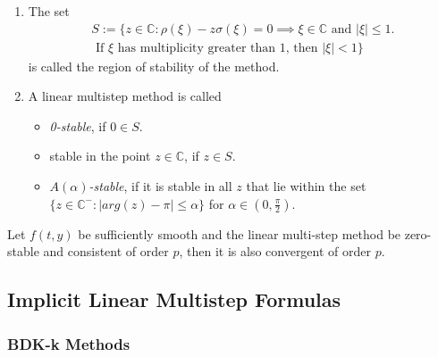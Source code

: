 	\begin{frame}
			\begin{definition}
			\begin{enumerate}
				\item 
				The set
				\begin{equation}
					\begin{aligned}
						S := \{z \in \mathbb{C} : \rho(\xi) - z \sigma(\xi) = 0 \implies \xi \in \mathbb{C} \text{ and } |\xi| \leq 1. \\
						\text{ If $\xi$ has multiplicity greater than $1$, then } |\xi| < 1\}
					\end{aligned}
				\end{equation}
				is called the region of stability of the method.
				\item 
				A linear multistep method is called
				\begin{itemize}
					\item \emph{0-stable}, if $0 \in S$.
					\item stable in the point $z \in \mathbb{C}$, if $z \in S$.
					\item \emph{$A(\alpha)$-stable}, if it is stable in all $z$ that lie within the set $\{z \in \mathbb{C}^- : |arg(z)-\pi| \leq \alpha\}$ for $\alpha \in (0, \frac{\pi}{2})$.		 
				\end{itemize}
			\end{enumerate}
		\end{definition}
	\end{frame}
	
	\begin{frame}
		\begin{theorem}%
			\label{th: null-stbaility and consistence is convergence}
			Let $f(t,y)$ be sufficiently smooth and the linear multi-step method be zero-stable and consistent of order $p$, then it is also convergent of order $p$.
		\end{theorem}
	\end{frame}
	
	
	\subsection{Implicit Linear Multistep Formulas}
	
	\subsubsection{BDK-k Methods}
	
